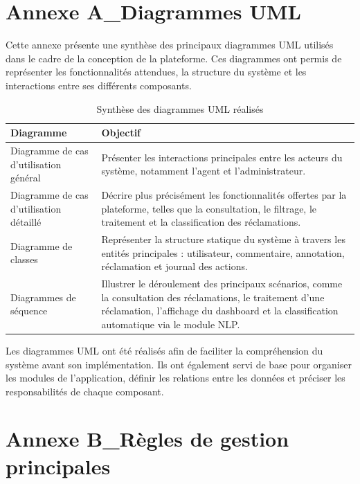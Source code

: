 \documentclass[12pt,a4paper,oneside]{report}
\begin{document}
\chapter*{Annexe A\_Diagrammes UML}

Cette annexe présente une synthèse des principaux diagrammes UML utilisés dans le cadre de la conception de la plateforme. Ces diagrammes ont permis de représenter les fonctionnalités attendues, la structure du système et les interactions entre ses différents composants.

\begin{table}[H]
\centering
\small
\caption{Synthèse des diagrammes UML réalisés}
\label{tab:annexe_uml}
\begin{tabular}{|p{4cm}|p{9cm}|}
\hline
\textbf{Diagramme} & \textbf{Objectif} \\
\hline
Diagramme de cas d'utilisation général & Présenter les interactions principales entre les acteurs du système, notamment l'agent et l'administrateur. \\
\hline
Diagramme de cas d'utilisation détaillé & Décrire plus précisément les fonctionnalités offertes par la plateforme, telles que la consultation, le filtrage, le traitement et la classification des réclamations. \\
\hline
Diagramme de classes & Représenter la structure statique du système à travers les entités principales : utilisateur, commentaire, annotation, réclamation et journal des actions. \\
\hline
Diagrammes de séquence & Illustrer le déroulement des principaux scénarios, comme la consultation des réclamations, le traitement d'une réclamation, l'affichage du dashboard et la classification automatique via le module NLP. \\
\hline
\end{tabular}
\end{table}

Les diagrammes UML ont été réalisés afin de faciliter la compréhension du système avant son implémentation. Ils ont également servi de base pour organiser les modules de l'application, définir les relations entre les données et préciser les responsabilités de chaque composant.

\clearpage

\chapter*{Annexe B\_Règles de gestion principales}
\end{document}

